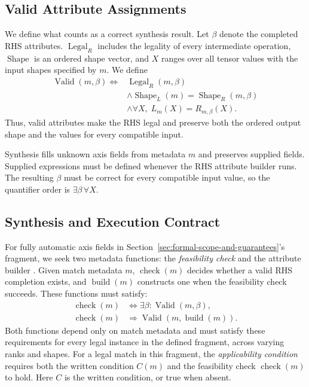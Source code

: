 \subsection{Valid Attribute Assignments}
\label{sec:valid-attribute-assignments}
We define what counts as a correct synthesis result.
Let $\beta$ denote the completed RHS attributes.
$\operatorname{Legal}_R$ includes the legality of every intermediate
operation, $\operatorname{Shape}$ is an ordered shape vector, and $X$ ranges
over all tensor values with the input shapes specified by $m$. We define
\begin{equation}
\begin{aligned}
 \operatorname{Valid}(m,\beta)\iff{}&
 \operatorname{Legal}_R(m,\beta)\\
 &\land\operatorname{Shape}_L(m)=\operatorname{Shape}_R(m,\beta)\\
 &\land\forall X,\; L_m(X)=R_{m,\beta}(X).
\end{aligned}
\label{eq:valid}
\end{equation}
Thus, valid attributes make the RHS legal and preserve both the ordered
output shape and the values for every compatible input.

Synthesis fills unknown axis fields from metadata $m$ and preserves supplied
fields. Supplied expressions must be defined whenever the RHS attribute
builder runs.
The resulting $\beta$ must be correct for every compatible input value,
so the quantifier order is $\exists\beta\,\forall X$.

\subsection{Synthesis and Execution Contract}
\label{sec:synthesis-and-execution-contract}
For fully automatic axis fields in Section~\ref{sec:formal-scope-and-guarantees}'s fragment,
we seek two metadata functions: the \emph{feasibility check}
 and the attribute builder . Given match metadata
$m$, $\operatorname{check}(m)$ decides whether a valid RHS completion
exists, and $\operatorname{build}(m)$ constructs one when the feasibility
check succeeds. These functions must satisfy:
\begin{align}
 \operatorname{check}(m)&\iff\exists\beta:\operatorname{Valid}(m,\beta),
 \label{eq:check-goal}\\
 \operatorname{check}(m)&\Rightarrow
 \operatorname{Valid}(m,\operatorname{build}(m)).
 \label{eq:build-goal}
\end{align}
Both functions depend only on match metadata and must satisfy these
requirements for every legal instance in the defined fragment, across
varying ranks and shapes.
For a legal match in this fragment, the \emph{applicability condition}
requires both the written condition $C(m)$ and the feasibility check
$\operatorname{check}(m)$ to hold. Here $C$ is the written 
condition, or true when absent.

